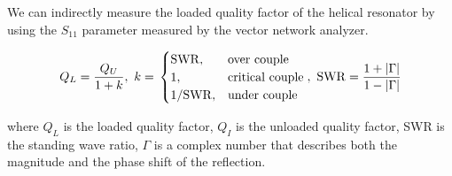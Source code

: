 We can indirectly measure the loaded quality factor of the helical resonator by using the ${S}_{11}$ parameter measured by the vector network analyzer.

\begin{equation}
    Q_L = \frac{Q_U}{1 + k},\ k =\\
    \begin{cases}
        \mathrm{SWR},     & \text{over couple}     \\
        1,                & \text{critical couple} \\
        1 / \mathrm{SWR}, & \text{under couple}    \\
    \end{cases}
    ,\ \mathrm{SWR} = \frac{1 + |\Gamma|}{1 - |\Gamma|}
\end{equation}

where $Q_L$ is the loaded quality factor, $Q_I$ is the unloaded quality factor, SWR is the standing wave ratio, $\Gamma$ is a complex number that describes both the magnitude and the phase shift of the reflection.


